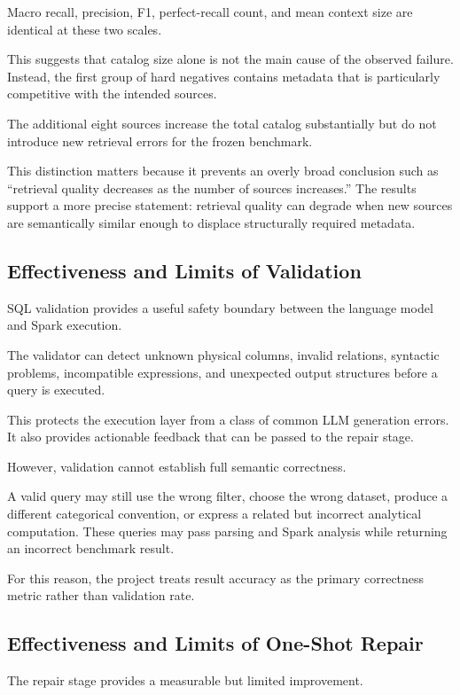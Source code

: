 Macro recall, precision, F1, perfect-recall count, and mean context size are
identical at these two scales.

This suggests that catalog size alone is not the main cause of the observed
failure. Instead, the first group of hard negatives contains metadata that is
particularly competitive with the intended sources.

The additional eight sources increase the total catalog substantially but do
not introduce new retrieval errors for the frozen benchmark.

This distinction matters because it prevents an overly broad conclusion such
as ``retrieval quality decreases as the number of sources increases.'' The
results support a more precise statement: retrieval quality can degrade when
new sources are semantically similar enough to displace structurally required
metadata.


\subsection{Effectiveness and Limits of Validation}

SQL validation provides a useful safety boundary between the language model
and Spark execution.

The validator can detect unknown physical columns, invalid relations,
syntactic problems, incompatible expressions, and unexpected output
structures before a query is executed.

This protects the execution layer from a class of common LLM generation
errors. It also provides actionable feedback that can be passed to the repair
stage.

However, validation cannot establish full semantic correctness.

A valid query may still use the wrong filter, choose the wrong dataset,
produce a different categorical convention, or express a related but
incorrect analytical computation. These queries may pass parsing and Spark
analysis while returning an incorrect benchmark result.

For this reason, the project treats result accuracy as the primary correctness
metric rather than validation rate.


\subsection{Effectiveness and Limits of One-Shot Repair}

The repair stage provides a measurable but limited improvement.

